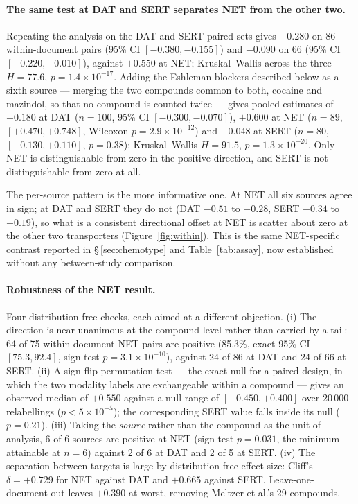 \documentclass[11pt,a4paper]{article}
\begin{document}
\paragraph{The same test at DAT and SERT separates NET from the other two.} Repeating
the analysis on the DAT and SERT paired sets gives $-0.280$ on 86 within-document pairs
(95\% CI $[-0.380,-0.155]$) and $-0.090$ on 66 (95\% CI $[-0.220,-0.010]$), against
$+0.550$ at NET; Kruskal--Wallis across the three $H=77.6$, $p=1.4\times10^{-17}$. Adding
the Eshleman blockers described below as a sixth source --- merging the two compounds
common to both, cocaine and mazindol, so that no compound is counted twice --- gives
pooled estimates of $-0.180$ at DAT ($n=100$, 95\% CI $[-0.300,-0.070]$), $\mathbf{+0.600}$
at NET ($n=89$, $[+0.470,+0.748]$, Wilcoxon $p=2.9\times10^{-12}$) and $-0.048$ at SERT
($n=80$, $[-0.130,+0.110]$, $p=0.38$); Kruskal--Wallis $H=91.5$,
$p=1.3\times10^{-20}$. Only NET is distinguishable from zero in the positive direction,
and SERT is not distinguishable from zero at all.

The per-source pattern is the more informative one. At NET all six sources agree in
sign; at DAT and SERT they do not (DAT $-0.51$ to $+0.28$, SERT $-0.34$ to $+0.19$), so
what is a consistent directional offset at NET is scatter about zero at the other two
transporters (Figure~\ref{fig:within}). This is the same NET-specific contrast reported
in \S\,\ref{sec:chemotype} and Table~\ref{tab:assay}, now established without any
between-study comparison.

\paragraph{Robustness of the NET result.} Four distribution-free checks, each aimed at a
different objection. (i) The direction is near-unanimous at the compound level rather than
carried by a tail: 64 of 75 within-document NET pairs are positive (85.3\%, exact 95\% CI
$[75.3,92.4]$, sign test $p=3.1\times10^{-10}$), against 24 of 86 at DAT and 24 of 66 at
SERT. (ii) A sign-flip permutation test --- the exact null for a paired design, in which
the two modality labels are exchangeable within a compound --- gives an observed median
of $+0.550$ against a null range of $[-0.450,+0.400]$ over 20\,000 relabellings
($p<5\times10^{-5}$); the corresponding SERT value falls inside its null ($p=0.21$).
(iii) Taking the \emph{source} rather than the compound as the unit of analysis, 6 of 6
sources are positive at NET (sign test $p=0.031$, the minimum attainable at $n=6$) against
2 of 6 at DAT and 2 of 5 at SERT. (iv) The separation between targets is large by
distribution-free effect size: Cliff's $\delta=+0.729$ for NET against DAT and $+0.665$
against SERT. Leave-one-document-out leaves $+0.390$ at worst, removing Meltzer et al.'s
29 compounds.
\end{document}
